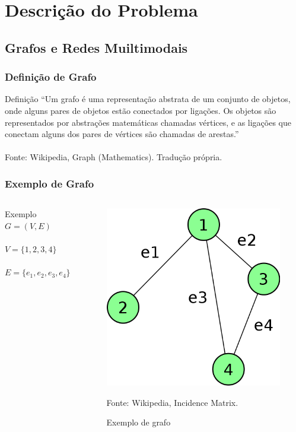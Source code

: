 \section{Descrição do Problema}

\subsection{Grafos e Redes Muiltimodais}

\frame
{
\frametitle{Definição de Grafo}
\begin{block}{Definição}
``Um grafo é uma representação abstrata de um conjunto de objetos, onde alguns pares de objetos estão conectados por ligações.
Os objetos são representados por abstrações matemáticas chamadas vértices, e as ligações que conectam alguns dos pares de vértices são chamadas de arestas.''
\\ ~ \\
\tiny
Fonte: Wikipedia, Graph (Mathematics). Tradução própria.
\end{block}
}

\frame
{
\frametitle{Exemplo de Grafo}
\begin{columns}[c]
\column{1.5in}
	\begin{exampleblock}{Exemplo}
		$G = (V,E)$ \\
		$ $ \\
		$V = \{1,2,3,4\}$ \\
		$ $ \\
		$E = \{e_1,e_2,e_3,e_4\}$ 
	\end{exampleblock}
\column{1.5in}
	\begin{figure}
		\includegraphics[width=\textwidth]{./imgs/grafo.png}
		\caption{Exemplo de grafo}
		\tiny
		Fonte: Wikipedia, Incidence Matrix.
	\end{figure}
\end{columns}
}

